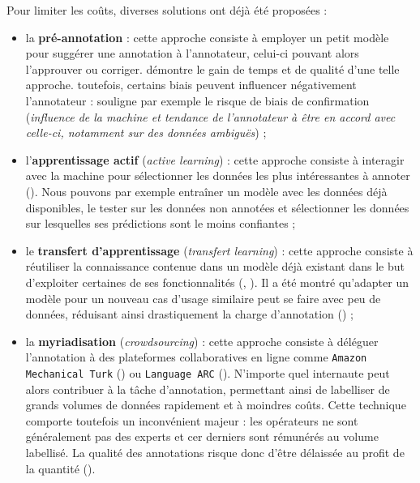 			\begin{leftBarIdea}
				Pour limiter les coûts, diverses solutions ont déjà été proposées :
				\begin{itemize}
					\item la \textbf{pré-annotation} :
						cette approche consiste à employer un petit modèle pour suggérer une annotation à l'annotateur, celui-ci pouvant alors l'approuver ou corriger.
						\cite{fort-sagot:2010:influence-preannotation-postagged} démontre le gain de temps et de qualité d'une telle approche.
						toutefois, certains biais peuvent influencer négativement l'annotateur : \cite{dandapat-etal:2009:complex-linguistic-annotation} souligne par exemple le risque de biais de confirmation (\textit{influence de la machine et tendance de l'annotateur à être en accord avec celle-ci, notamment sur des données ambiguës}) ;
					\item l'\textbf{apprentissage actif} (\textit{active learning}) :
						cette approche consiste à interagir avec la machine pour sélectionner les données les plus intéressantes à annoter (\cite{settles:2010:active-learning-literature}).
						Nous pouvons par exemple entraîner un modèle avec les données déjà disponibles, le tester sur les données non annotées et sélectionner les données sur lesquelles ses prédictions sont le moins confiantes ;
					\item le \textbf{transfert d'apprentissage} (\textit{transfert learning}) :
						cette approche consiste à réutiliser la connaissance contenue dans un modèle déjà existant dans le but d'exploiter certaines de ses fonctionnalités (\cite{zhuang-etal:2021:comprehensive-survey-transfer}, \cite{iman-etal:2023:review-deep-transfer}).
						Il a été montré qu'adapter un modèle pour un nouveau cas d'usage similaire peut se faire avec peu de données, réduisant ainsi drastiquement la charge d'annotation (\cite{parnami-lee:2022:learning-few-examples}) ;
					\item la \textbf{myriadisation} (\textit{crowdsourcing}) :
						cette approche consiste à déléguer l'annotation à des plateformes collaboratives en ligne comme \texttt{Amazon Mechanical Turk} (\cite{callison-burch-dredze:2010:creating-speech-language}) ou \texttt{Language ARC} (\cite{fiumara-etal:2020:languagearc-developing-language}).
						N'importe quel internaute peut alors contribuer à la tâche d'annotation, permettant ainsi de labelliser de grands volumes de données rapidement et à moindres coûts.
						Cette technique comporte toutefois un inconvénient majeur : les opérateurs ne sont généralement pas des experts et cer derniers sont rémunérés au volume labellisé.
						La qualité des annotations risque donc d'être délaissée au profit de la quantité (\cite{sagot-etal:2011:turc-mecanique-pour}).
				\end{itemize}
			\end{leftBarIdea}
		
